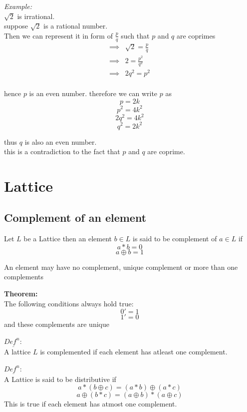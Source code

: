 \documentclass[11pt,letterpaper]{article}
\newenvironment{mytheorem}                    
        {\begin{mdframed}\textbf{Theorem:} \\}
        {\end{mdframed}}
\newenvironment{example}                             
        {\noindent\textit{Example:}\\}
	{}
\newenvironment{definition}
	{\begin{mdframed}$\underline{\textit{Def}^\textit{n}:} $\\}
	{\end{mdframed}}
\begin{document}
\begin{example}
  $\sqrt 2$ is irrational. \\ 

  suppose $\sqrt 2$ is a rational number.\\ 
  Then we can represent it in form of $\frac{p}{q}$ such that $p$ and $q$ are coprimes\\

  \begin{align*}
    \implies &\sqrt 2 = \frac{p}{q}\\
    \implies & 2 = \frac{p^2}{q^2}\\
    \implies & 2 q^2 = {p^2}\\
  \end{align*}

  hence $p$ is an even number.
  therefore we can write $p$ as 
  \[
    p = 2k 
  \]
  \[
    p^2 = 4k^2
  \]
  \[
    2q^2 = 4k^2
  \]
  \[
    q^2 = 2k^2
  \]

  thus $q$ is also an even number.\\ this is a contradiction to the fact that $p$ and $q$ are coprime.
\end{example}


\section{Lattice}

\subsection{Complement of an element}
Let $L$ be a Lattice then an element $b \in L$ is said to be complement of $a\in L$ if 
\[
  a * b = 0
\]
\[
  a \oplus b = 1
\]

An element may have no complement, unique complement or more than one complements

\begin{mytheorem}
  The following conditions always hold true:
  \[
    0' = 1
  \]
  \[
    1' = 0
  \]
  and these complements are unique
\end{mytheorem}

\begin{definition}
  A lattice $L$ is complemented if each element has atleast one complement. 
\end{definition}

\begin{definition}
  A Lattice is said to be distributive if 
  \[
    a * (b \oplus c) = (a * b) \oplus (a * c)
  \]
  \[
    a \oplus (b * c) = (a \oplus b) * (a \oplus c)
  \]
  This is true if each element has atmost one complement.
\end{definition}
\end{document}
